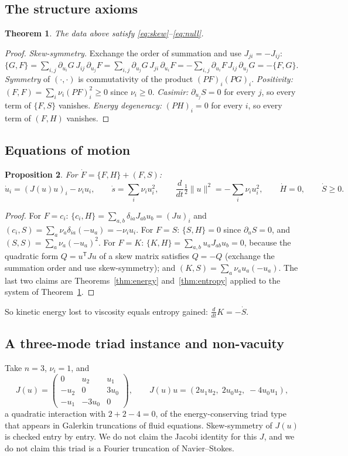 \documentclass[11pt,a4paper]{article}
\newtheorem{theorem}{Theorem}[section]
\newtheorem{proposition}[theorem]{Proposition}
\begin{document}
\subsection{The structure axioms}
\begin{theorem}\label{thm:axioms}
The data above satisfy \eqref{eq:skew}--\eqref{eq:null}.
\end{theorem}
\begin{proof}
\emph{Skew-symmetry.} Exchange the order of summation and use \(J_{ji}=-J_{ij}\):
\(\{G,F\}=\sum_{i,j}\partial_{u_i}G\,J_{ij}\,\partial_{u_j}F=\sum_{i,j}\partial_{u_j}G\,J_{ji}\,\partial_{u_i}F
=-\sum_{i,j}\partial_{u_i}F\,J_{ij}\,\partial_{u_j}G=-\{F,G\}\).
\emph{Symmetry} of \((\cdot,\cdot)\) is commutativity of the product \((PF)_i(PG)_i\).
\emph{Positivity:} \((F,F)=\sum_i\nu_i(PF)_i^2\ge0\) since \(\nu_i\ge0\).
\emph{Casimir:} \(\partial_{u_j}S=0\) for every \(j\), so every term of \(\{F,S\}\) vanishes.
\emph{Energy degeneracy:} \((PH)_i=0\) for every \(i\), so every term of \((F,H)\) vanishes.
\end{proof}

\subsection{Equations of motion}
\begin{proposition}\label{prop:eom}
For \(\dot F=\{F,H\}+(F,S)\):
\[
\dot u_i=(J(u)u)_i-\nu_iu_i,\qquad \dot s=\sum_i\nu_iu_i^2,\qquad
\frac{d}{dt}\tfrac12\|u\|^2=-\sum_i\nu_iu_i^2,\qquad \dot H=0,\qquad \dot S\ge0.
\]
\end{proposition}
\begin{proof}
For \(F=c_i\): \(\{c_i,H\}=\sum_{a,b}\delta_{ia}J_{ab}u_b=(Ju)_i\) and
\((c_i,S)=\sum_a\nu_a\delta_{ia}(-u_a)=-\nu_iu_i\).
For \(F=S\): \(\{S,H\}=0\) since \(\partial_{u}S=0\), and \((S,S)=\sum_a\nu_a(-u_a)^2\).
For \(F=K\): \(\{K,H\}=\sum_{a,b}u_aJ_{ab}u_b=0\), because the quadratic form \(Q=u^{\mathsf T}Ju\) of a skew
matrix satisfies \(Q=-Q\) (exchange the summation order and use skew-symmetry); and
\((K,S)=\sum_a\nu_au_a(-u_a)\). The last two claims are Theorems~\ref{thm:energy} and~\ref{thm:entropy}
applied to the system of Theorem~\ref{thm:axioms}.
\end{proof}
So kinetic energy lost to viscosity equals entropy gained: \(\frac{d}{dt}K=-\dot S\).

\subsection{A three-mode triad instance and non-vacuity}
Take \(n=3\), \(\nu_i=1\), and
\[
J(u)=\begin{pmatrix}0&u_2&u_1\\-u_2&0&3u_0\\-u_1&-3u_0&0\end{pmatrix},\qquad
J(u)u=(2u_1u_2,\;2u_0u_2,\;-4u_0u_1),
\]
a quadratic interaction with \(2+2-4=0\), of the energy-conserving triad type that appears in Galerkin
truncations of fluid equations. Skew-symmetry of \(J(u)\) is checked entry by entry. We do not claim the
Jacobi identity for this \(J\), and we do not claim this triad is a Fourier truncation of Navier--Stokes.
\end{document}
